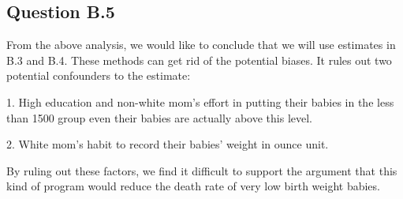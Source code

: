 \documentclass[a4paper,11pt]{article}
\begin{document}
\subsection*{Question B.5}

From the above analysis, we would like to conclude that we will use estimates in B.3 and B.4. These methods can get rid of the potential biases. It rules out two potential confounders to the estimate:

1. High education and non-white mom's effort in putting their babies in the less than 1500 group even their babies are actually above this level.

2. White mom's habit to record their babies' weight in ounce unit.

By ruling out these factors, we find it difficult to support the argument that this kind of program would reduce the death rate of very low birth weight babies.
\end{document}
